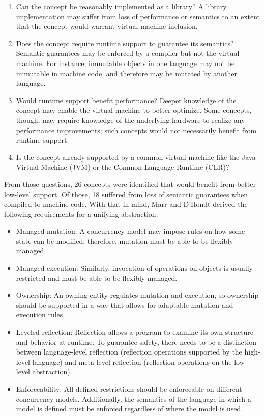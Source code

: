 \documentclass{sig-alternate}
\begin{document}
\begin{enumerate}
  \item Can the concept be reasonably implemented as a library? A library implementation may suffer from loss of performance or semantics to an extent that the concept would warrant virtual machine inclusion.

  \item Does the concept require runtime support to guarantee its semantics? Semantic guarantees may be enforced by a compiler but not the virtual machine. For instance, immutable objects in one language may not be immutable in machine code, and therefore may be mutated by another language.

  \item Would runtime support benefit performance? Deeper knowledge of the concept may enable the virtual machine to better optimize. Some concepts, though, may require knowledge of the underlying hardware to realize any performance improvements; such concepts would not necessarily benefit from runtime support.

  \item Is the concept already supported by a common virtual machine like the Java Virtual Machine (JVM) or the Common Language Runtime (CLR)?
\end{enumerate}

From those questions, 26 concepts were identified that would benefit from better low-level support. Of those, 18 suffered from loss of semantic guarantees when compiled to machine code. With that in mind, Marr and D'Hondt derived the following requirements for a unifying abstraction:

\begin{itemize}
  \item Managed mutation: A concurrency model may impose rules on how some state can be modified; therefore, mutation must be able to be flexibly managed.

  \item Managed execution: Similarly, invocation of operations on objects is usually restricted and must be able to be flexibly managed.

  \item Ownership: An owning entity regulates mutation and execution, so ownership should be supported in a way that allows for adaptable mutation and execution rules.

  \item Leveled reflection: Reflection allows a program to examine its own structure and behavior at runtime. To guarantee safety, there needs to be a distinction between language-level reflection (reflection operations supported by the high-level language) and meta-level reflection (reflection operations on the low-level abstraction).

  \item Enforceability: All defined restrictions should be enforceable on different concurrency models. Additionally, the semantics of the language in which a model is defined must be enforced regardless of where the model is used.
\end{itemize}
\end{document}
